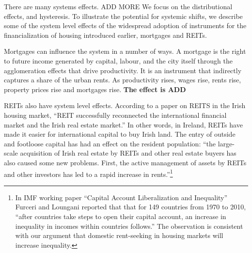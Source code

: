 There are many systems effects. ADD MORE %
We focus on the distributional effects, and hysteresis.
To illustrate the potential for systemic shifts, we describe some of the system level effects of the widespread adoption of instruments for the financialization of housing introduced earlier, mortgages and REITs. 

Mortgages can influence the system in a number of ways. %
A mortgage is the right to future income generated by capital, labour, and the city itself through the agglomeration effects that drive productivity. It is an instrument that indirectly captures a share of the urban rents. As productivity rises, wages rise, rents rise, property prices rise and mortgages rise. \textbf{The effect is ADD}

REITs also have system level effects. %
According to a paper \cite{wangAnalyzeImpactREITs2021} on REITS in the Irish housing market, ``REIT successfully reconnected the international financial market and the Irish real estate market.'' In other words, in Ireland, REITs have made it easier for international capital to buy Irish land. The entry of outside and footloose capital has had an effect on the resident population:  ``the large-scale acquisition of Irish real estate by REITs and other real estate buyers has also caused some new problems. First, the active management of assets by REITs and other investors has led to a rapid increase in rents.''\footnote{In  IMF working paper ``Capital Account Liberalization and Inequality'' \cite{furceriCapitalAccountLiberalization2015}  Furceri and Loungani reported that that for 149 countries from 1970 to 2010, ``after countries take steps to open their capital account, an increase in inequality in incomes within countries follows.'' The observation is consistent with our argument  that domestic \gls{rent-seeking} in housing markets will increase inequality.}  

